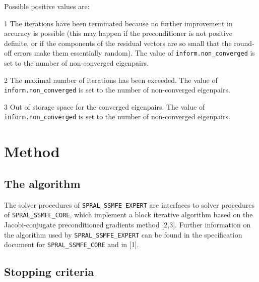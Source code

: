 Possible positive values  are: 
%
\begin{description}
\item{1}
\hskip 9pt
The iterations have been terminated because no further improvement
in accuracy is possible (this may happen if the preconditioner is
not positive definite, or if the components of the residual vectors
are so small that the round-off
errors make them essentially random).
The value of {\tt inform.non\_converged} is set to the number
of non-converged eigenpairs.
\item{2}
\hskip 9pt
The maximal number of iterations has been exceeded.
The value of {\tt inform.non\_converged} is set to the number
of non-converged eigenpairs.
\item{3}
\hskip 9pt
Out of storage space for the converged eigenpairs.
The value of {\tt inform.non\_converged} is set to the number
of non-converged eigenpairs.
%
\end{description}

\section{Method}
\label{ssmfe_expert:method}

\subsection{The algorithm}

The solver procedures of
\texttt{SPRAL\_SSMFE\_EXPERT}
are interfaces to solver procedures of
\texttt{SPRAL\_SSMFE\_CORE}, which 
implement a block iterative algorithm
based on the Jacobi-conjugate preconditioned gradients %
method [2,3].
Further information on the algorithm used by
\texttt{SPRAL\_SSMFE\_EXPERT} can be found in the
specification document for \texttt{SPRAL\_SSMFE\_CORE}
and in [1].

\subsection{Stopping criteria}

